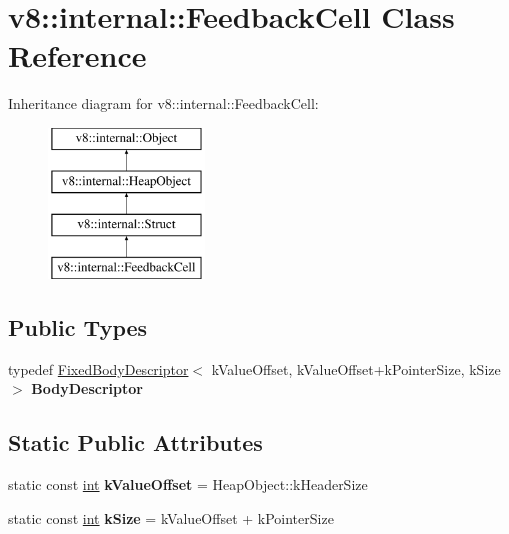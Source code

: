\hypertarget{classv8_1_1internal_1_1FeedbackCell}{}\section{v8\+:\+:internal\+:\+:Feedback\+Cell Class Reference}
\label{classv8_1_1internal_1_1FeedbackCell}
Inheritance diagram for v8\+:\+:internal\+:\+:Feedback\+Cell\+:\begin{figure}[H]
\begin{center}
\leavevmode
\includegraphics[height=4.000000cm]{classv8_1_1internal_1_1FeedbackCell}
\end{center}
\end{figure}
\subsection*{Public Types}
\begin{DoxyCompactItemize}
\item 
\mbox{\label{classv8_1_1internal_1_1FeedbackCell_a09ef8653a059ae0c98e8a52a20cb01f1}} 
typedef \mbox{\hyperlink{classv8_1_1internal_1_1FixedBodyDescriptor}{Fixed\+Body\+Descriptor}}$<$ k\+Value\+Offset, k\+Value\+Offset+k\+Pointer\+Size, k\+Size $>$ {\bfseries Body\+Descriptor}
\end{DoxyCompactItemize}
\subsection*{Static Public Attributes}
\begin{DoxyCompactItemize}
\item 
\mbox{\label{classv8_1_1internal_1_1FeedbackCell_a7d30804444665d4b349894ab33cd8f2f}} 
static const \mbox{\hyperlink{classint}{int}} {\bfseries k\+Value\+Offset} = Heap\+Object\+::k\+Header\+Size
\item 
\mbox{\label{classv8_1_1internal_1_1FeedbackCell_aad62628cd8a28d09ebc5e010ebd85dc3}} 
static const \mbox{\hyperlink{classint}{int}} {\bfseries k\+Size} = k\+Value\+Offset + k\+Pointer\+Size
\end{DoxyCompactItemize}
